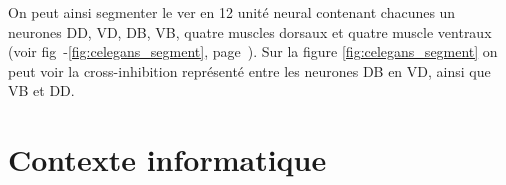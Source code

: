 On peut ainsi segmenter le ver en 12 unité neural contenant chacunes un neurones DD, VD,
DB, VB, quatre muscles dorsaux et quatre muscle ventraux (voir fig~-\ref{fig:celegans_segment},
page~\pageref{fig:celegans_segment}). Sur la figure \ref{fig:celegans_segment} on peut voir la
cross-inhibition représenté entre les neurones DB en VD, ainsi que VB et DD.



\section{Contexte informatique} %
\label{sec:Contexte informatique}


